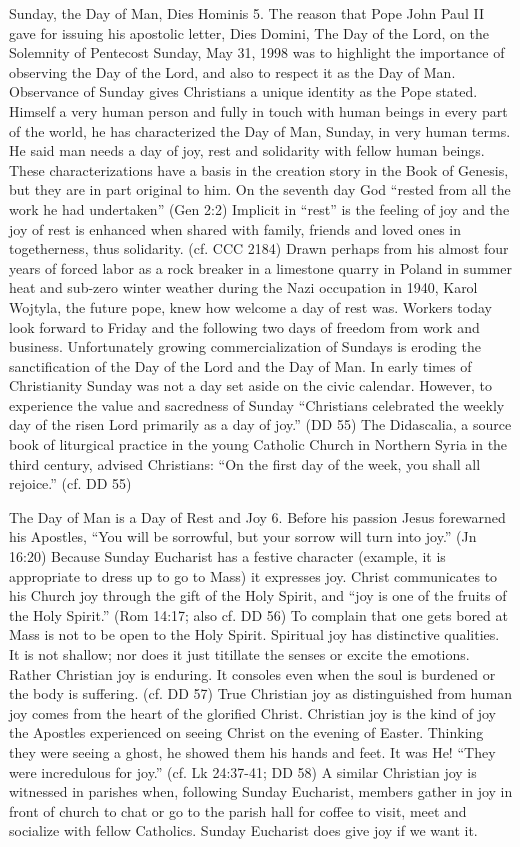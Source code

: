 \documentclass[oneside]{book}
\begin{document}
Sunday, the Day of Man, Dies Hominis
5. The reason that Pope John Paul II gave for issuing his apostolic letter, Dies
Domini, The Day of the Lord, on the Solemnity of Pentecost Sunday, May 31, 1998
was to highlight the importance of observing the Day of the Lord, and also to
respect it as the Day of Man. Observance of Sunday gives Christians a unique
identity as the Pope stated. Himself a very human person and fully in touch with
human beings in every part of the world, he has characterized the Day of Man,
Sunday, in very human terms. He said man needs a day of joy, rest and solidarity
with fellow human beings.
These characterizations have a basis in the creation story in the Book of
Genesis, but they are in part original to him. On the seventh day God ``rested
from all the work he had undertaken'' (Gen 2:2) Implicit in ``rest'' is the
feeling of joy and the joy of rest is enhanced when shared with family, friends
and loved ones in togetherness, thus solidarity. (cf. CCC 2184) Drawn perhaps
from his almost four years of forced labor as a rock breaker in a limestone
quarry in Poland in summer heat and sub-zero winter weather during the Nazi
occupation in 1940, Karol Wojtyla, the future pope, knew how welcome a day of
rest was. Workers today look forward to Friday and the following two days of
freedom from work and business.
Unfortunately growing commercialization of Sundays is eroding the sanctification
of the Day of the Lord and the Day of Man. In early times of Christianity Sunday
was not a day set aside on the civic calendar. However, to experience the value
and sacredness of Sunday ``Christians celebrated the weekly day of the risen
Lord primarily as a day of joy.'' (DD 55) The Didascalia, a source book of
liturgical practice in the young Catholic Church in Northern Syria in the third
century, advised Christians: ``On the first day of the week, you shall all
rejoice.'' (cf. DD 55)

The Day of Man is a Day of Rest and Joy
6. Before his passion Jesus forewarned his Apostles, ``You will be sorrowful,
but your sorrow will turn into joy.'' (Jn 16:20) Because Sunday Eucharist has a
festive character (example, it is appropriate to dress up to go to Mass) it
expresses joy. Christ communicates to his Church joy through the gift of the
Holy Spirit, and ``joy is one of the fruits of the Holy Spirit.'' (Rom 14:17;
also cf. DD 56) To complain that one gets bored at Mass is not to be open to the
Holy Spirit. Spiritual joy has distinctive qualities. It is not shallow; nor
does it just titillate the senses or excite the emotions. Rather Christian joy
is enduring. It consoles even when the soul is burdened or the body is
suffering. (cf. DD 57)
True Christian joy as distinguished from human joy comes from the heart of the
glorified Christ. Christian joy is the kind of joy the Apostles experienced on
seeing Christ on the evening of Easter. Thinking they were seeing a ghost, he
showed them his hands and feet. It was He! ``They were incredulous for joy.''
(cf. Lk 24:37-41; DD 58) A similar Christian joy is witnessed in parishes when,
following Sunday Eucharist, members gather in joy in front of church to chat or
go to the parish hall for coffee to visit, meet and socialize with fellow
Catholics. Sunday Eucharist does give joy if we want it.
\end{document}
